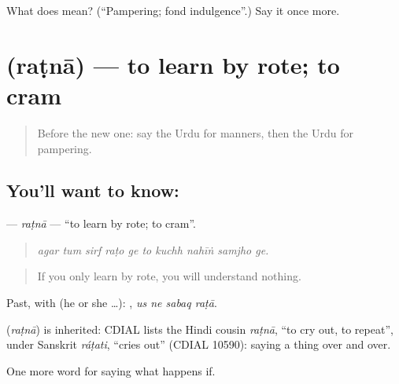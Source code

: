 \begin{tcolorbox}[breakable,colback=teal!4,colframe=teal!35!black,title={Before you move on}]
What does  mean? (\textquotedblleft{}Pampering; fond indulgence\textquotedblright{}.) Say it once more.
\end{tcolorbox}
\section[\texorpdfstring{\ur{رٹنا} (raṭnā)}{رٹنا (raṭnā)}]{ (raṭnā) — to learn by rote; to cram}

\label{lesson:UR-C384-ratna}



\begin{quote}
Before the new one: say the Urdu for manners, then the Urdu for pampering.
\end{quote}

\subsection*{You'll want to know: }
\textbf{} — \emph{raṭnā} — \textquotedblleft{}to learn by rote; to cram\textquotedblright{}.

\begin{quote}
         
\end{quote}

\begin{quote}
\emph{agar tum sirf raṭo ge to kuchh nahīṅ samjho ge.}
\end{quote}

\begin{quote}
If you only learn by rote, you will understand nothing.
\end{quote}

Past, with  (he or she …):    , \emph{us ne sabaq raṭā}.

\begin{cousinweb}
\textbf{} (\emph{raṭnā}) is inherited: CDIAL lists the Hindi cousin \emph{raṭnā}, \textquotedblleft{}to cry out, to repeat\textquotedblright{}, under Sanskrit \emph{ráṭati}, \textquotedblleft{}cries out\textquotedblright{} (CDIAL 10590): saying a thing over and over.
\end{cousinweb}

\begin{grammarlens}[title={What you've built}]
One more word for saying what happens if.
\end{grammarlens}

